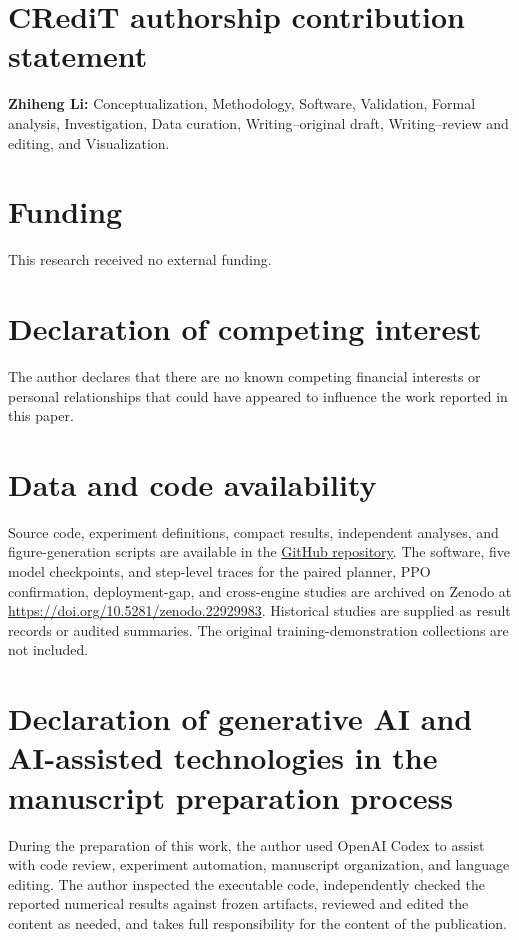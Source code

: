 \section*{CRediT authorship contribution statement}

\textbf{Zhiheng Li:} Conceptualization, Methodology, Software, Validation,
Formal analysis, Investigation, Data curation, Writing--original draft,
Writing--review and editing, and Visualization.

\section*{Funding}

This research received no external funding.

\section*{Declaration of competing interest}

The author declares that there are no known competing financial interests or
personal relationships that could have appeared to influence the work
reported in this paper.

\section*{Data and code availability}

Source code, experiment definitions, compact results, independent analyses,
and figure-generation scripts are available in the
\href{https://github.com/suibian678/Regime-Adaptive-Risk-Aware-MPPI-Control-for-Force-Aware-Robotic-Wiping-}{GitHub repository}.
The software, five model checkpoints, and step-level traces for the paired
planner, PPO confirmation, deployment-gap, and cross-engine studies are
archived on Zenodo at \url{https://doi.org/10.5281/zenodo.22929983}.
Historical studies are supplied as result records or audited summaries.
The original training-demonstration collections are not included.

\section*{Declaration of generative AI and AI-assisted technologies in the
manuscript preparation process}

During the preparation of this work, the author used OpenAI Codex to assist
with code review, experiment automation, manuscript organization, and language
editing. The author inspected the executable code, independently checked the
reported numerical results against frozen artifacts, reviewed and edited the
content as needed, and takes full responsibility for the content of the
publication.

